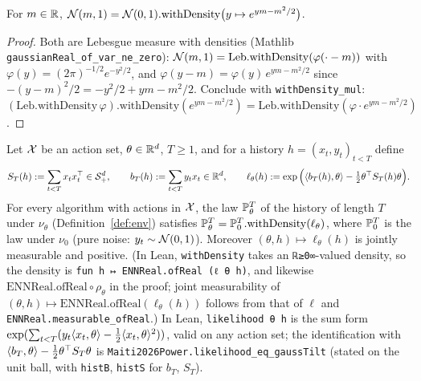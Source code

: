 \begin{lemma}\label{lem:pb_gaussian_density_ratio}
\leanok
For $m\in\mathbb{R}$, $\mathcal{N}(m,1) = \mathcal{N}(0,1).\mathrm{withDensity}\big(y\mapsto e^{ym-m^2/2}\big)$.
\end{lemma}

\begin{proof}
\leanok
Both are Lebesgue measure with densities (Mathlib \texttt{gaussianReal\_of\_var\_ne\_zero}):
$\mathcal{N}(m,1) = \mathrm{Leb}.\mathrm{withDensity}(\varphi(\cdot-m))$ with
$\varphi(y) = (2\pi)^{-1/2}e^{-y^2/2}$, and
$\varphi(y-m) = \varphi(y)\,e^{ym-m^2/2}$ since $-(y-m)^2/2 = -y^2/2+ym-m^2/2$. Conclude with
\texttt{withDensity\_mul}: $(\mathrm{Leb}.\mathrm{withDensity}\,\varphi).\mathrm{withDensity}(e^{ym-m^2/2}) = \mathrm{Leb}.\mathrm{withDensity}(\varphi\cdot e^{ym-m^2/2})$.
\end{proof}

\begin{corollary}\label{cor:pb_gaussian_likelihood}
\leanok
{}
Let $\mathcal{X}$ be an action set, $\theta\in\mathbb{R}^d$, $T\ge1$, and for a history $h = (x_t,y_t)_{t<T}$
define
\[
  S_T(h) := \sum_{t<T}x_tx_t^\top\in\mathcal{S}_{+}^{d},\qquad b_T(h) := \sum_{t<T}y_tx_t\in\mathbb{R}^d,\qquad
  \ell_\theta(h) := \exp\Big(\langle b_T(h), \theta \rangle-\tfrac12\theta^\top S_T(h)\theta\Big) .
\]
For every algorithm with actions in $\mathcal{X}$, the law $\mathbb{P}_\theta^T$ of the history of length
$T$ under $\nu_\theta$ (Definition~\ref{def:env}) satisfies
$\mathbb{P}_\theta^T = \mathbb{P}_0^T.\mathrm{withDensity}(\ell_\theta)$, where $\mathbb{P}_0^T$ is the law
under $\nu_0$ (pure noise: $y_t\sim\mathcal{N}(0,1)$). Moreover $(\theta,h)\mapsto\ell_\theta(h)$ is
jointly measurable and positive. (In Lean, \texttt{withDensity} takes an
\texttt{ℝ≥0∞}-valued density, so the density is \texttt{fun h ↦ ENNReal.ofReal (ℓ θ h)}, and
likewise $\mathrm{ENNReal.ofReal}\circ\rho_\theta$ in the proof; joint measurability of
$(\theta,h)\mapsto\mathrm{ENNReal.ofReal}(\ell_\theta(h))$ follows from that of $\ell$ and
\texttt{ENNReal.measurable\_ofReal}.) In Lean, \texttt{likelihood θ h} is the sum form
$\exp(\sum_{t<T}(y_t\langle x_t, \theta \rangle - \tfrac12\langle x_t, \theta \rangle^2))$, valid on any action
set; the identification with $\langle b_T, \theta \rangle - \tfrac12\theta^\top S_T\theta$ is
\texttt{Maiti2026Power.likelihood\_eq\_gaussTilt} (stated on the unit ball, with
\texttt{histB}, \texttt{histS} for $b_T$, $S_T$).
\end{corollary}

